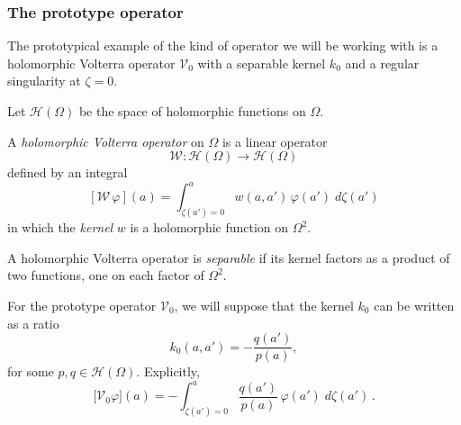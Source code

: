 \documentclass[final]{siamart220329}
\newcommand{\holo}{\mathcal{H}}
\newcommand{\genvolterra}{\mathcal{W}}
\newcommand{\genker}{w}
\newcommand{\hardpart}{\mathcal{V}_0}
\newcommand{\hardker}{k_0}
\newcommand{\domain}{\Omega}
\newenvironment{revtwo}{\color{revred}}{\color{black}}
\newenvironment{revtwo}{}{}
\begin{document}
\subsubsection{The prototype operator}\label{setting:basic}
The prototypical example of the kind of operator we will be working with is a holomorphic Volterra operator $\hardpart$ with a separable kernel $\hardker$ and a regular singularity at $\zeta = 0$.

Let $\holo(\domain)$ be the space of holomorphic functions on $\domain$.
\begin{definition}\label{defn:volterra}
A {\em holomorphic Volterra operator} on $\domain$ is a linear operator
\[\genvolterra\colon\holo(\domain)\to\holo(\domain) \]
defined by an integral
\begin{revtwo}
\[ [\genvolterra\,\varphi](a) = \int_{\zeta(a') = 0}^a \genker(a, a')\,\varphi(a')\;d\zeta(a') \]
\end{revtwo}
in which the {\em kernel} $w$ is a holomorphic function on $\Omega^2$.
\end{definition}
\begin{definition}
A holomorphic Volterra operator is {\em separable} if its kernel factors as a product of two functions, one on each factor of $\Omega^2$.
\end{definition}
For the prototype operator $\hardpart$, we will suppose that the kernel $\hardker$ can be written as a ratio
\[ \hardker(a, a') = - \frac{q(a')}{p(a)}, \]
for some $p, q \in \mathcal{H}(\Omega)$. \begin{revtwo}Explicitly,
\[ \big[\hardpart \varphi\big](a) = - \int_{\zeta(a')=0}^{a} \frac{q(a')}{p(a)}\,\varphi(a')\;d\zeta(a')\,. \]
\end{revtwo}
\end{document}
